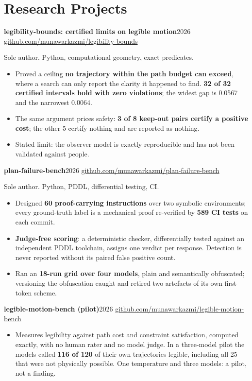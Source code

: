 \documentclass[10pt]{article}
\newcommand{\entry}[2]{{\textbf{#1}\hfill {\small #2}\par}}
\newcommand{\sub}[1]{{\small\color{dim}#1\par}}
\newcommand{\gap}{\vspace{4pt}}
\begin{document}
\section{Research Projects}

\entry{legibility-bounds: certified limits on legible motion}{2026 \;\textperiodcentered\; \href{https://github.com/munawarkazmi/legibility-bounds}{github.com/munawarkazmi/legibility-bounds}}
\sub{Sole author. Python, computational geometry, exact predicates.}
\begin{itemize}
\item Proved a ceiling \textbf{no trajectory within the path budget can exceed}, where a search can only report the clarity
it happened to find. \textbf{32 of 32 certified intervals hold with zero violations}; the widest gap is 0.0567 and the
narrowest 0.0064.
\item The same argument prices safety: \textbf{3 of 8 keep-out pairs certify a positive cost}; the other 5 certify nothing and
are reported as nothing.
\item Stated limit: the observer model is exactly reproducible and has not been validated against people.
\end{itemize}
\gap
\entry{plan-failure-bench}{2026 \;\textperiodcentered\; \href{https://github.com/munawarkazmi/plan-failure-bench}{github.com/munawarkazmi/plan-failure-bench}}
\sub{Sole author. Python, PDDL, differential testing, CI.}
\begin{itemize}
\item Designed \textbf{60 proof-carrying instructions} over two symbolic environments; every ground-truth label is a
mechanical proof re-verified by \textbf{589 CI tests} on each commit.
\item \textbf{Judge-free scoring}: a deterministic checker, differentially tested against an independent PDDL toolchain,
assigns one verdict per response. Detection is never reported without its paired false positive count.
\item Ran an \textbf{18-run grid over four models}, plain and semantically obfuscated; versioning the obfuscation caught
and retired two artefacts of its own first token scheme.
\end{itemize}
\gap
\entry{legible-motion-bench (pilot)}{2026 \;\textperiodcentered\; \href{https://github.com/munawarkazmi/legible-motion-bench}{github.com/munawarkazmi/legible-motion-bench}}
\begin{itemize}
\item Measures legibility against path cost and constraint satisfaction, computed exactly, with no human rater and
no model judge. In a three-model pilot the models called \textbf{116 of 120} of their own trajectories legible,
including all 25 that were not physically possible. One temperature and three models: a pilot, not a finding.
\end{itemize}
\end{document}
